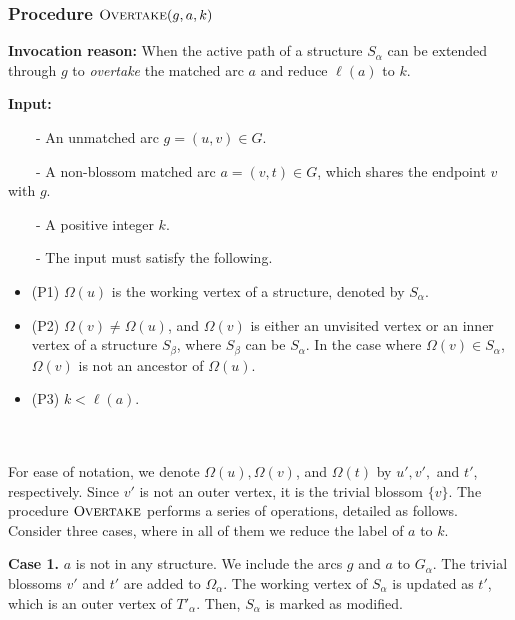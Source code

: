 \documentclass{article}
\newcommand{\alp}{\alpha}
\newcommand{\Omg}{\Omega}
\newcommand{\algOvertake}{\textsc{Overtake}\xspace}
\newcommand{\mytab}{\ \ \ \ }
\begin{document}
\subsubsection{Procedure $\algOvertake(g, a, k)$}
\label{sec:overtake}
\begin{minipage}{0.95\linewidth}
    \begin{mdframed}[backgroundcolor=gray!15, linecolor=red!40!black]
    \textbf{Invocation reason:} When the active path of a structure $S_\alp$ can be extended through $g$ to \emph{overtake} the matched arc $a$ and reduce $\ell(a)$ to $k$.
    
    \textbf{Input:}

    \mytab - An unmatched arc $g = (u, v) \in G$.

    \mytab - A non-blossom matched arc $a = (v, t) \in G$, which shares the endpoint $v$ with $g$.
    
    \mytab - A positive integer $k$.

    \mytab - The input must satisfy the following.
        \begin{itemize}
            \item[] (P1) $\Omg(u)$ is the working vertex of a structure, denoted by $S_\alp$.
            \item[] (P2) $\Omg(v) \neq \Omg(u)$, and $\Omg(v)$ is either an unvisited vertex or an inner vertex of a structure $S_\beta$, where $S_\beta$ can be $S_\alp$. In the case where $\Omg(v) \in S_\alp$, $\Omg(v)$ is not an ancestor of $\Omg(u)$.
            \item[] (P3) $k < \ell(a)$.
        \end{itemize}

    \end{mdframed}
\end{minipage}
\\\\
For ease of notation, we denote $\Omg(u), \Omg(v)$, and $\Omg(t)$ by $u', v',$ and $t'$, respectively.
Since $v'$ is not an outer vertex, it is the trivial blossom $\{v\}$.
The procedure $\algOvertake$ performs a series of operations, detailed as follows.
Consider three cases, where in all of them we reduce the label of $a$ to $k$.

\vspace{2mm}
\noindent \textbf{Case 1.} $a$ is not in any structure.
We include the arcs $g$ and $a$ to $G_\alp$.
The trivial blossoms $v'$ and $t'$ are added to $\Omg_\alp$.
The working vertex of $S_\alp$ is updated as $t'$, which is an outer vertex of $T'_\alp$.
Then, $S_\alp$ is marked as modified.
\end{document}
